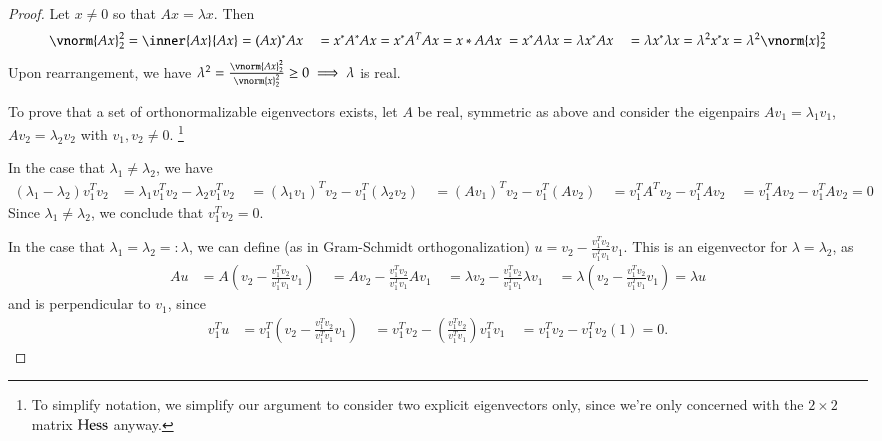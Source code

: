   \begin{proof}
     	Let $x\ne 0$ so that $Ax = \lambda x$. Then 
     	\begin{align*}
     	\vnorm{Ax}_2^2 = \inner{Ax}{Ax}  &= (Ax)^{*} Ax \
     	&= x^{*}A^{*}Ax = x^{*}A^T A x = x*A A x \
     	&= x^{*} A \lambda x = \lambda x^{*} A x \
     	&= \lambda x^{*} \lambda x = \lambda^2 x^{*} x = \lambda ^2 \vnorm{x}_2^2
     	\end{align*}
     	Upon rearrangement, we have
     	$\lambda^2 = \frac{\vnorm{Ax}_2^2}{\vnorm{x}_2^2} \ge 0 \implies \lambda $ is real.
     	
     	To prove that a set of orthonormalizable eigenvectors exists,
     	let $A$ be real, symmetric as above and consider the eigenpairs
     	$Av_1 = \lambda_1 v_1$, $Av_2 = \lambda_2 v_2$ with $v_1, v_2 \ne 0$.
     	\footnote{To simplify notation, we simplify our argument to consider two explicit eigenvectors only, since we're only concerned with the $2\times 2$ matrix $\mathrm{Hess}$
     		anyway.}
     	
     	In the case that $\lambda_1 \ne \lambda_2$, we have
     	\begin{align*}
     	(\lambda_1 - \lambda_2)v_1^T v_2 &= \lambda_1 v_1^T v_2 - \lambda_2 v_1^T v_2 \
     	&= (\lambda_1 v_1)^T v_2 - v_1^T (\lambda_2 v_2) \
     	&= (Av_1)^T v_2 - v_1^T (Av_2) \
     	&= v_1^T A^T v_2 - v_1^T A v_2 \
     	&= v_1^T A v_2 - v_1^T A v_2 = 0
     	\end{align*}
     	Since $\lambda_1 \ne \lambda_2$, we conclude that $v_1^T v_2 = 0$.
     	
     	In the case that $\lambda_1 = \lambda_2 =: \lambda$, we can define
     	(as in Gram-Schmidt orthogonalization) $u = v_2 - \frac{v_1^Tv_2}{v_1^Tv_1}v_1$.
     	This is an eigenvector for $\lambda=\lambda_2$, as
     	\begin{align*}
     	Au &= A\left(v_2 - \frac{v_1^Tv_2}{v_1^Tv_1} v_1\right) \
     	&= A v_2 - \frac{v_1^Tv_2}{v_1^Tv_1} A v_1 \
     	&= \lambda v_2- \frac{v_1^Tv_2}{v_1^Tv_1} \lambda v_1 \
     	&= \lambda \left( v_2 - \frac{v_1^Tv_2}{v_1^Tv_1} v_1 \right) = \lambda u
     	\end{align*}
     	and is perpendicular to $v_1$, since
     	\begin{align*}
     	v_1^T u &= v_1^T\left(v_2 - \frac{v_1^Tv_2}{v_1^Tv_1}v_1\right) \
     	&= v_1^T v_2 - \left(\frac{v_1^Tv_2}{v_1^Tv_1}\right) v_1^T v_1 \
     	&= v_1^T v_2 - v_1^Tv_2 (1) = 0.
     	\end{align*}
  \end{proof}
  
